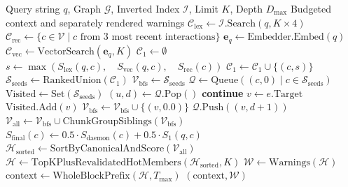 \documentclass[10pt,twocolumn]{article}
\begin{document}
\begin{algorithm}[t]
\caption{Three-Phase Topological Recall (Simplified)}
\label{alg:recall}
\small
\begin{algorithmic}[1]
\Require Query string $q$, Graph $\mathcal{G}$, Inverted Index $\mathcal{I}$, Limit $K$, Depth $D_{\max}$
\Ensure Budgeted context and separately rendered warnings
\State $\mathcal{C}_{\text{lex}} \gets \mathcal{I}.\text{Search}(q, K \times 4)$
\State $\mathcal{C}_{\text{rec}} \gets \{c \in \mathcal{V} \mid c \text{ from } 3 \text{ most recent interactions}\}$
\State $\mathbf{e}_q \gets \text{Embedder}.\text{Embed}(q)$
\State $\mathcal{C}_{\text{vec}} \gets \text{VectorSearch}(\mathbf{e}_q, K)$
\State $\mathcal{C}_1 \gets \emptyset$
    \State $s \gets \max(S_{\text{lex}}(q,c), \quad S_{\text{vec}}(q,c), \quad S_{\text{rec}}(c))$
    \State $\mathcal{C}_1 \gets \mathcal{C}_1 \cup \{(c, s)\}$
\EndFor
\State $\mathcal{S}_{\text{seeds}} \gets \text{RankedUnion}(\mathcal{C}_1)$ 
\State $\mathcal{V}_{\text{bfs}} \gets \mathcal{S}_{\text{seeds}}$
\State $\mathcal{Q} \gets \text{Queue}((c,0) \mid c \in \mathcal{S}_{\text{seeds}})$
\State $\text{Visited} \gets \text{Set}(\mathcal{S}_{\text{seeds}})$
    \State $(u,d) \gets \mathcal{Q}.\text{Pop}()$
     \State \textbf{continue} \EndIf
        \State $v \gets e.\text{Target}$
            \State $\text{Visited}.\text{Add}(v)$
            \State $\mathcal{V}_{\text{bfs}} \gets \mathcal{V}_{\text{bfs}} \cup \{(v, 0.0)\}$
            \State $\mathcal{Q}.\text{Push}((v,d+1))$
        \EndIf
    \EndFor
\EndWhile
\State $\mathcal{V}_{\text{all}} \gets \mathcal{V}_{\text{bfs}} \cup \text{ChunkGroupSiblings}(\mathcal{V}_{\text{bfs}})$
    \State $S_{\text{final}}(c) \gets 0.5 \cdot S_{\text{daemon}}(c) + 0.5 \cdot S_1(q, c)$
\EndFor
\State $\mathcal{H}_{\text{sorted}} \gets \text{SortByCanonicalAndScore}(\mathcal{V}_{\text{all}})$
\State $\mathcal{H} \gets \text{TopKPlusRevalidatedHotMembers}(\mathcal{H}_{\text{sorted}}, K)$
\State $\mathcal{W} \gets \text{Warnings}(\mathcal{H})$
\State $\text{context} \gets \text{WholeBlockPrefix}(\mathcal{H}, T_{\max})$
\State \Return $(\text{context},\mathcal{W})$
\end{algorithmic}
\end{algorithm}
\end{document}
